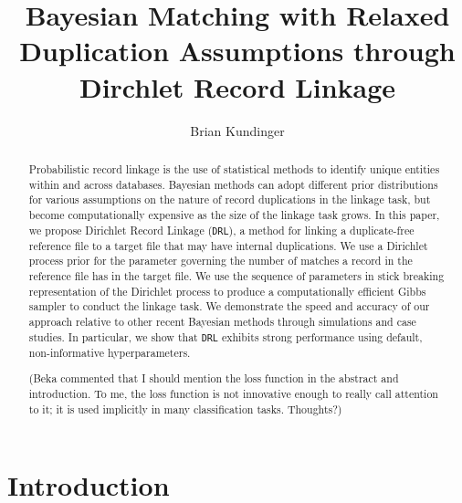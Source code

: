 \documentclass[12pt,letterpaper]{article}
\title{Bayesian Matching with Relaxed Duplication Assumptions through Dirchlet Record Linkage}
\author{Brian Kundinger}
\newcommand{\1}[1]{\mathbb{I}\!\left[#1\right]} %
\def\spacingset#1{\renewcommand{\baselinestretch}%
  {#1}\small\normalsize} \spacingset{1}
\def \brian#1{{\color{red} (#1)}}
\begin{document}
\maketitle
%
\begin{abstract}
	Probabilistic record linkage is the use of statistical methods to identify unique entities within and across databases. Bayesian methods can adopt different prior distributions for various assumptions on the nature of record duplications in the linkage task, but become computationally expensive as the size of the linkage task grows. In this paper, we propose Dirichlet Record Linkage (\texttt{DRL}), a method for linking a duplicate-free reference file to a target file that may have internal duplications. We use a Dirichlet process prior for the parameter governing the number of matches a record in the reference file has in the target file. We use the sequence of parameters in stick breaking representation of the Dirichlet process to produce a computationally efficient Gibbs sampler to conduct the linkage task. We demonstrate the speed and accuracy of our approach relative to other recent Bayesian methods through simulations and case studies. In particular, we show that \texttt{DRL} exhibits strong performance using default, non-informative hyperparameters.  
	
	\brian{Beka commented that I should mention the loss function in the abstract and introduction. To me, the loss function is not innovative enough to really call attention to it; it is used implicitly in many classification tasks. Thoughts?}
\end{abstract} 

%
\spacingset{1.5}
\newpage

\section{Introduction}\label{sec:introduction}

\end{document}
